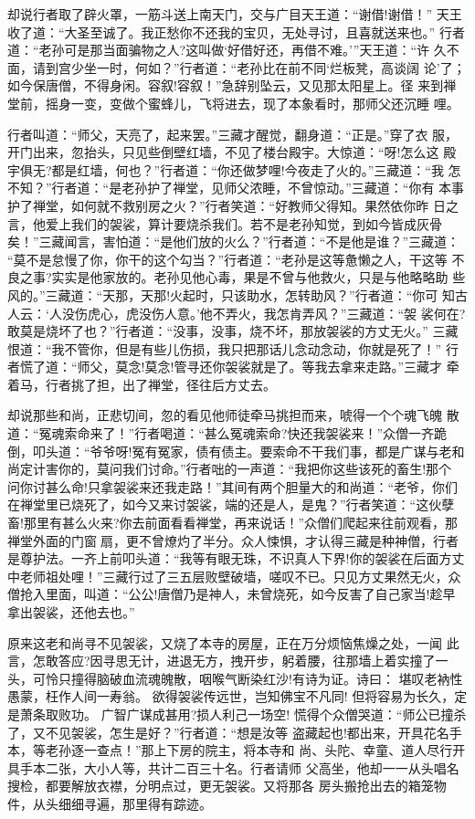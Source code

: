 却说行者取了辟火罩，一筋斗送上南天门，交与广目天王道：“谢借!谢借！”
天王收了道：“大圣至诚了。我正愁你不还我的宝贝，无处寻讨，且喜就送来也。”
行者道：“老孙可是那当面骗物之人?这叫做‘好借好还，再借不难。’”天王道：“许
久不面，请到宫少坐一时，何如？”行者道：“老孙比在前不同‘烂板凳，高谈阔
论’了；如今保唐僧，不得身闲。容叙!容叙！”急辞别坠云，又见那太阳星上。径
来到禅堂前，摇身一变，变做个蜜蜂儿，飞将进去，现了本象看时，那师父还沉睡
哩。

行者叫道：“师父，天亮了，起来罢。”三藏才醒觉，翻身道：“正是。”穿了衣
服，开门出来，忽抬头，只见些倒壁红墙，不见了楼台殿宇。大惊道：“呀!怎么这
殿宇俱无?都是红墙，何也？”行者道：“你还做梦哩!今夜走了火的。”三藏道：“我
怎不知？”行者道：“是老孙护了禅堂，见师父浓睡，不曾惊动。”三藏道：“你有
本事护了禅堂，如何就不救别房之火？”行者笑道：“好教师父得知。果然依你昨
日之言，他爱上我们的袈裟，算计要烧杀我们。若不是老孙知觉，到如今皆成灰骨
矣！”三藏闻言，害怕道：“是他们放的火么？”行者道：“不是他是谁？”三藏道：
“莫不是怠慢了你，你干的这个勾当？”行者道：“老孙是这等惫懒之人，干这等
不良之事?实实是他家放的。老孙见他心毒，果是不曾与他救火，只是与他略略助
些风的。”三藏道：“天那，天那!火起时，只该助水，怎转助风？”行者道：“你可
知古人云：‘人没伤虎心，虎没伤人意。’他不弄火，我怎肯弄风？”三藏道：“袈
裟何在?敢莫是烧坏了也？”行者道：“没事，没事，烧不坏，那放袈裟的方丈无火。”
三藏恨道：“我不管你，但是有些儿伤损，我只把那话儿念动念动，你就是死了！”
行者慌了道：“师父，莫念!莫念!管寻还你袈裟就是了。等我去拿来走路。”三藏才
牵着马，行者挑了担，出了禅堂，径往后方丈去。

却说那些和尚，正悲切间，忽的看见他师徒牵马挑担而来，唬得一个个魂飞魄
散道：“冤魂索命来了！”行者喝道：“甚么冤魂索命?快还我袈裟来！”众僧一齐跪
倒，叩头道：“爷爷呀!冤有冤家，债有债主。要索命不干我们事，都是广谋与老和
尚定计害你的，莫问我们讨命。”行者咄的一声道：“我把你这些该死的畜生!那个
问你讨甚么命!只拿袈裟来还我走路！”其间有两个胆量大的和尚道：“老爷，你们
在禅堂里已烧死了，如今又来讨袈裟，端的还是人，是鬼？”行者笑道：“这伙孽
畜!那里有甚么火来?你去前面看看禅堂，再来说话！”众僧们爬起来往前观看，那
禅堂外面的门窗扇，更不曾燎灼了半分。众人悚惧，才认得三藏是种神僧，行者
是尊护法。一齐上前叩头道：“我等有眼无珠，不识真人下界!你的袈裟在后面方丈
中老师祖处哩！”三藏行过了三五层败壁破墙，嗟叹不已。只见方丈果然无火，众
僧抢入里面，叫道：“公公!唐僧乃是神人，未曾烧死，如今反害了自己家当!趁早
拿出袈裟，还他去也。”

原来这老和尚寻不见袈裟，又烧了本寺的房屋，正在万分烦恼焦燥之处，一闻
此言，怎敢答应?因寻思无计，进退无方，拽开步，躬着腰，往那墙上着实撞了一
头，可怜只撞得脑破血流魂魄散，咽喉气断染红沙!有诗为证。诗曰：
堪叹老衲性愚蒙，枉作人间一寿翁。
欲得袈裟传远世，岂知佛宝不凡同!
但将容易为长久，定是萧条取败功。
广智广谋成甚用?损人利己一场空!
慌得个众僧哭道：“师公已撞杀了，又不见袈裟，怎生是好？”行者道：“想是汝等
盗藏起也!都出来，开具花名手本，等老孙逐一查点！”那上下房的院主，将本寺和
尚、头陀、幸童、道人尽行开具手本二张，大小人等，共计二百三十名。行者请师
父高坐，他却一一从头唱名搜检，都要解放衣襟，分明点过，更无袈裟。又将那各
房头搬抢出去的箱笼物件，从头细细寻遍，那里得有踪迹。

